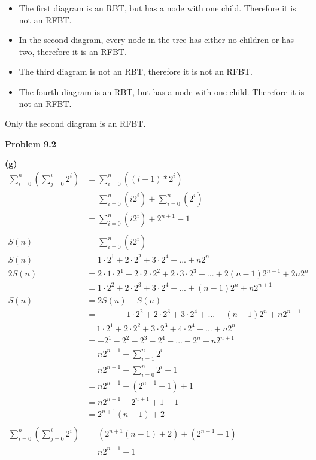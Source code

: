 \documentclass[fleqn]{article}
\begin{document}
\begin{itemize}
	\item The first diagram is an RBT, but has a node with one child. Therefore it is not an RFBT.\par
	\item In the second diagram, every node in the tree has either no children or has two, therefore it is an RFBT.\par
	\item The third diagram is not an RBT, therefore it is not an RFBT.\par
	\item The fourth diagram is an RBT, but has a node with one child. Therefore it is not an RFBT.\par
\end{itemize}
Only the second diagram is an RFBT.

\newpage
{\Large\bf Problem 9.2}\vspace{1em}\par
\textbf{(g)}
\begin{align*}
	\sum_{i=0}^{n}\left(\sum_{j=0}^{i} 2^i \right) &= \sum_{i=0}^{n}\left(\left(i+1\right)*2^i \right)\\
	&=\sum_{i=0}^{n}\left(i2^i\right)+\sum_{i=0}^{n}\left(2^i\right)\\
	&=\sum_{i=0}^{n}\left(i2^i\right)+2^{n+1}-1\\
	\\
	S(n)&=\sum_{i=0}^{n}\left(i2^i\right)\\
	S(n)&=1 \cdot 2^1 + 2 \cdot 2^2 + 3 \cdot 2^4 + ... + n2^n\\
	2S(n)&=2 \cdot 1 \cdot 2^1 + 2 \cdot 2 \cdot 2^2 + 2 \cdot 3 \cdot 2^3 + ... + 2(n-1)2^{n-1} + 2n2^n\\
	&=1 \cdot 2^2 + 2 \cdot 2^3 + 3 \cdot 2^4 + ... + (n-1)2^n + n2^{n+1}\\
	S(n)&=2S(n)-S(n)\\
	&=\qquad\quad\:\: 1 \cdot 2^2 + 2 \cdot 2^3 + 3 \cdot 2^4 + ... + (n-1)2^n + n2^{n+1}\ -\\
	&\quad\ 1 \cdot 2^1 + 2 \cdot 2^2 + 3 \cdot 2^3 + 4 \cdot 2^4 + ... + n2^n\\
	&=-2^1-2^2-2^3-2^4-...-2^n+n2^{n+1}\\
	&=n2^{n+1}-\sum_{i=1}^{n}2^i\\
	&=n2^{n+1}-\sum_{i=0}^{n}2^i+1\\
	&=n2^{n+1}-\left(2^{n+1}-1\right)+1\\
	&=n2^{n+1}-2^{n+1}+1+1\\
	&=2^{n+1}(n-1)+2\\
	\\
	\sum_{i=0}^{n}\left(\sum_{j=0}^{i} 2^i \right) &= \left(2^{n+1}(n-1)+2\right)+\left(2^{n+1}-1\right)\\
	&=n2^{n+1}+1
\end{align*}
\end{document}
